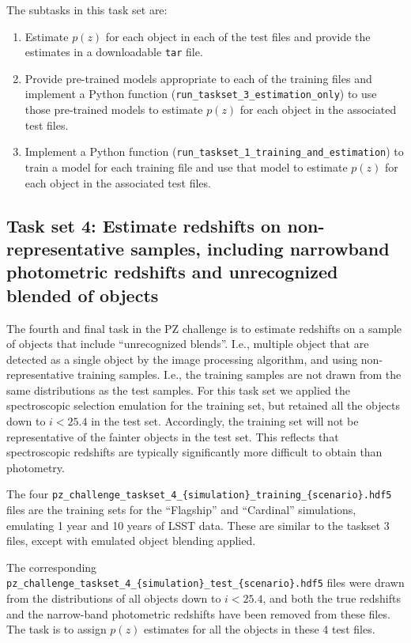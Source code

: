 \documentclass[11pt,twoside,letterpaper,onecolumn,english]{article}
\begin{document}
The subtasks in this task set are:

\begin{enumerate}
  \item{Estimate $p(z)$ for each object in each of the test files and
      provide the estimates in a downloadable \texttt{tar} file.}
  \item{Provide pre-trained models appropriate to each of the training
      files and implement a Python function (\texttt{run\_taskset\_3\_estimation\_only}) to use those
      pre-trained models to estimate $p(z)$ for each object in the
      associated test files.}    
  \item{Implement a Python function (\texttt{run\_taskset\_1\_training\_and\_estimation}) to train a model for
      each training file and use that model to estimate $p(z)$ for
      each object in the associated test files.}    
\end{enumerate}




\subsection{Task set 4: Estimate redshifts on non-representative
  samples, including narrowband photometric redshifts and unrecognized
  blended of objects}


The fourth and final task in the PZ challenge is to estimate redshifts
on a sample of objects that include “unrecognized blends”. I.e.,
multiple object that are detected as a single object by the image
processing algorithm, and using non-representative training samples. I.e., the training samples
are not drawn from the same distributions as the test samples. For this
task set we applied the spectroscopic selection emulation for the
training set, but retained all the objects down to $i < 25.4$ in
the test set. Accordingly, the training set will not be representative
of the fainter objects in the test set. This reflects that spectroscopic
redshifts are typically significantly more difficult to obtain than
photometry.

The four 
\texttt{pz\_challenge\_taskset\_4\_\{simulation\}\_training\_\{scenario\}.hdf5}
files are the training sets for the ``Flagship'' and ``Cardinal''
simulations, emulating 1 year and 10 years of LSST data.  These are similar to the taskset 3
files, except with emulated object blending applied.

The corresponding 
\texttt{pz\_challenge\_taskset\_4\_\{simulation\}\_test\_\{scenario\}.hdf5}
files were \allowbreak  drawn from the distributions of all objects down to $i <
25.4$, and both the true redshifts and the narrow-band photometric
redshifts have been removed from these files. The task is to assign
$p(z)$ estimates for all the objects in these 4 test files.
\end{document}
